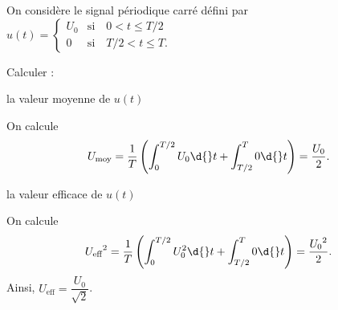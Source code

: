 On considère le signal périodique carré défini par 
$u(t) =
\begin{cases}
U_0 & \text{si}\quad 0<t\leq T/2\\
0 & \text{si}\quad T/2<t\leq T.
\end{cases}$

Calculer : 
\minusMedskip
\debutEntrainement


\begin{enonce}
la valeur moyenne de $u(t)$
\end{enonce}


\begin{corrige}
On calcule
\begin{equation*}
U_{\text{moy}}=\dfrac{1}{T}\left(\int_0^{T/2}U_0\d{}t+\int_{T/2}^T0\d{}t\right)=\dfrac{U_0}{2}.
\end{equation*}
\end{corrige}




\begin{enonce}
la valeur efficace de $u(t)$
\end{enonce}


\begin{corrige}
On calcule
\begin{equation*}
{U_{\text{eff}}}^2=\dfrac{1}{T}\left(\int_0^{T/2}U_0^2\d{}t+\int_{T/2}^T0\d{}t\right)=\dfrac{{U_0}^2}{2}. 
\end{equation*}
Ainsi, $U_{\text{eff}}=\dfrac{U_0}{\sqrt{2}}$.
\end{corrige}


\finEntrainement




